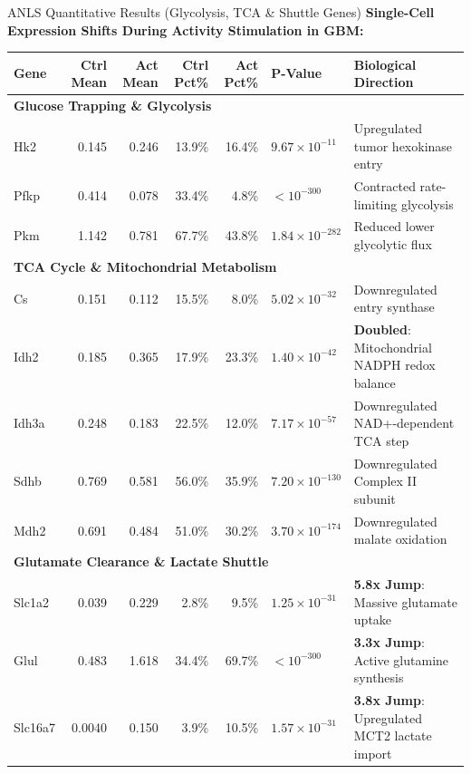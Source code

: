 \documentclass[10pt, aspectratio=169]{beamer}
\begin{document}
\begin{frame}{ANLS Quantitative Results (Glycolysis, TCA \& Shuttle Genes)}
  \centering
  {\small \textbf{Single-Cell Expression Shifts During Activity Stimulation in GBM:}}\par
  \vspace{0.10cm}
  \tiny
  \begin{tabular}{l r r r r l p{4.0cm}}
    \toprule
    \textbf{Gene} & \textbf{Ctrl Mean} & \textbf{Act Mean} & \textbf{Ctrl Pct\%} & \textbf{Act Pct\%} & \textbf{P-Value} & \textbf{Biological Direction} \\
    \midrule
    \multicolumn{7}{l}{\textbf{Glucose Trapping \& Glycolysis}} \\
    Hk2 & 0.145 & 0.246 & 13.9\% & 16.4\% & $9.67 \times 10^{-11}$ & Upregulated tumor hexokinase entry \\
    Pfkp & 0.414 & 0.078 & 33.4\% & 4.8\% & $< 10^{-300}$ & Contracted rate-limiting glycolysis \\
    Pkm & 1.142 & 0.781 & 67.7\% & 43.8\% & $1.84 \times 10^{-282}$ & Reduced lower glycolytic flux \\
    \midrule
    \multicolumn{7}{l}{\textbf{TCA Cycle \& Mitochondrial Metabolism}} \\
    Cs & 0.151 & 0.112 & 15.5\% & 8.0\% & $5.02 \times 10^{-32}$ & Downregulated entry synthase \\
    Idh2 & 0.185 & 0.365 & 17.9\% & 23.3\% & $1.40 \times 10^{-42}$ & \textbf{Doubled}: Mitochondrial NADPH redox balance \\
    Idh3a & 0.248 & 0.183 & 22.5\% & 12.0\% & $7.17 \times 10^{-57}$ & Downregulated NAD+-dependent TCA step \\
    Sdhb & 0.769 & 0.581 & 56.0\% & 35.9\% & $7.20 \times 10^{-130}$ & Downregulated Complex II subunit \\
    Mdh2 & 0.691 & 0.484 & 51.0\% & 30.2\% & $3.70 \times 10^{-174}$ & Downregulated malate oxidation \\
    \midrule
    \multicolumn{7}{l}{\textbf{Glutamate Clearance \& Lactate Shuttle}} \\
    Slc1a2 & 0.039 & 0.229 & 2.8\% & 9.5\% & $1.25 \times 10^{-31}$ & \textbf{5.8x Jump}: Massive glutamate uptake \\
    Glul & 0.483 & 1.618 & 34.4\% & 69.7\% & $< 10^{-300}$ & \textbf{3.3x Jump}: Active glutamine synthesis \\
    Slc16a7 & 0.0040 & 0.150 & 3.9\% & 10.5\% & $1.57 \times 10^{-31}$ & \textbf{3.8x Jump}: Upregulated MCT2 lactate import \\
    \bottomrule
  \end{tabular}
\end{frame}
\end{document}
